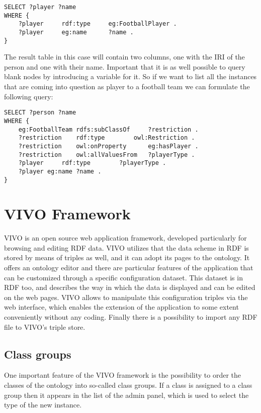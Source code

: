 \begin{lstlisting}[captionpos=b, caption=SPARQL Query II., label=2nd:sparql,
basicstyle=\footnotesize,frame=single]
SELECT ?player ?name 
WHERE { 
	?player		rdf:type	 eg:FootballPlayer .	
	?player		eg:name		 ?name .
}
\end{lstlisting}

The result table in this case will contain two columns, one with the IRI of the person and one with their name. Important that it is as well possible to query blank nodes by introducing a variable for it. So if we want to list all the instances that are coming into question as player to a football team we can formulate the following query:

\begin{lstlisting}[captionpos=b, caption=SPARQL Query III., label=3rd:sparql,
basicstyle=\footnotesize,frame=single]
SELECT ?person ?name
WHERE {
	eg:FootballTeam	rdfs:subClassOf		?restriction .
	?restriction	rdf:type		owl:Restriction .
	?restriction	owl:onProperty		eg:hasPlayer .
	?restriction	owl:allValuesFrom	?playerType .
	?player		rdf:type		?playerType .
	?player	eg:name	?name . 
}
\end{lstlisting}

\section{VIVO Framework}

VIVO is an open source web application framework, developed particularly for browsing and editing RDF data. VIVO utilizes that the data scheme in RDF is stored by means of triples as well, and it can adopt its pages to the ontology.  It offers an ontology editor and there are particular features of the application that can be customized through a specific configuration dataset.  This dataset is in RDF too, and describes the way in which the data is displayed and can be edited on the web pages. VIVO allows to manipulate this configuration triples via the web interface, which enables the extension of the application to some extent conveniently without any coding. Finally there is a possibility to import any RDF file to VIVO’s triple store.

\subsection{Class groups}

One important feature of the VIVO framework is the possibility to order the classes of the ontology into so-called class groups. If a class is assigned to a class group then it appears in the list of the admin panel, which is used to select the type of the new instance.

